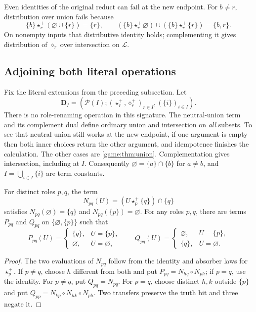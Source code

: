 Even identities of the original reduct can fail at the new endpoint.
For $b\ne r$, distribution over union fails because
\[
 \{b\}\star_r^+(\varnothing\cup\{r\})=\{r\},\qquad
 (\{b\}\star_r^+\varnothing)\cup
 (\{b\}\star_r^+\{r\})=\{b,r\}.
\]
On nonempty inputs that distributive identity holds; complementing it
gives distribution of $\diamond_r$ over intersection on $\mathcal L$.

\subsection{Adjoining both literal operations}

Fix the literal extensions from the preceding subsection. Let
\[
 \mathbf D_I=(\mathcal P(I);
       (\star_r^+,\diamond_r^+)_{r\in I},(\{i\})_{i\in I}).
\]
There is no role-renaming operation in this signature. The neutral-union
term and its complement dual define ordinary union and intersection on
\emph{all} subsets. To see that neutral union still works at the new
endpoint, if one argument is empty then both inner choices return the
other argument, and idempotence finishes the calculation. The other
cases are \cref{game:thm:union}. Complementation gives intersection,
including at $I$. Consequently $\varnothing=\{a\}\cap\{b\}$
for $a\ne b$, and $I=\bigcup_{i\in I}\{i\}$ are term constants.

\begin{lemma}\label{dual:lem:transfer}
For distinct roles $p,q$, the term
\begin{equation}\label{dual:eq:transfer}
 N_{pq}(U)=(U\star_p^+\{q\})\cap\{q\}
\end{equation}
satisfies $N_{pq}(\varnothing)=\{q\}$ and
$N_{pq}(\{p\})=\varnothing$.
For any roles $p,q$, there are terms $P_{pq}$ and $Q_{pq}$ on
$\{\varnothing,\{p\}\}$ such that
\[
 P_{pq}(U)=\begin{cases}\{q\},&U=\{p\},\\
 \varnothing,&U=\varnothing,\end{cases}
 \qquad
 Q_{pq}(U)=\begin{cases}\varnothing,&U=\{p\},\\
 \{q\},&U=\varnothing.\end{cases}
\]
\end{lemma}
\begin{proof}
The two evaluations of $N_{pq}$ follow from the identity and absorber
laws for $\star_p^+$. If $p\ne q$, choose $h$ different from
both and put $P_{pq}=N_{hq}\circ N_{ph}$; if $p=q$, use the
identity. For $p\ne q$, put $Q_{pq}=N_{pq}$. For $p=q$, choose
distinct $h,k$ outside $\{p\}$ and put
$Q_{pp}=N_{kp}\circ N_{hk}\circ N_{ph}$.
Two transfers preserve the truth bit and three negate it.
\end{proof}

